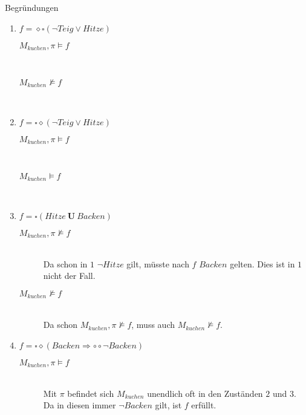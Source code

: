 \documentclass[a4paper]{scrartcl}
\begin{document}
Begründungen
\begin{enumerate}
    \item $f = \diamond\square(\lnot Teig \lor Hitze)$
        \begin{description}
            \item[$M_{kuchen}, \pi \models f$] \hfill \\

            \item[$M_{kuchen} \not\models f$] \hfill \\

        \end{description}

    \item $f = \square\diamond(\lnot Teig \lor Hitze)$
        \begin{description}
            \item[$M_{kuchen}, \pi \models f$] \hfill \\

            \item[$M_{kuchen} \models f$] \hfill \\

        \end{description}

    \item $f = \square(Hitze ~\textbf{U}~ Backen)$
        \begin{description}
            \item[$M_{kuchen}, \pi \not\models f$] \hfill \\
                Da schon in $1$ $\lnot Hitze$ gilt, müsste nach $f$ $Backen$
                gelten.
                Dies ist in $1$ nicht der Fall.

            \item[$M_{kuchen} \not\models f$] \hfill \\
                Da schon $M_{kuchen}, \pi \not\models f$, muss auch
                $M_{kuchen} \not\models f$.

        \end{description}

    \item $f = \square\diamond(Backen \Rightarrow \circ\circ\lnot Backen)$
        \begin{description}
            \item[$M_{kuchen}, \pi \models f$] \hfill \\
                Mit $\pi$ befindet sich $M_{kuchen}$ unendlich oft in den
                Zuständen $2$ und $3$.
                Da in diesen immer $\lnot Backen$ gilt, ist $f$ erfüllt.


\end{description}
\end{enumerate}
\end{document}
